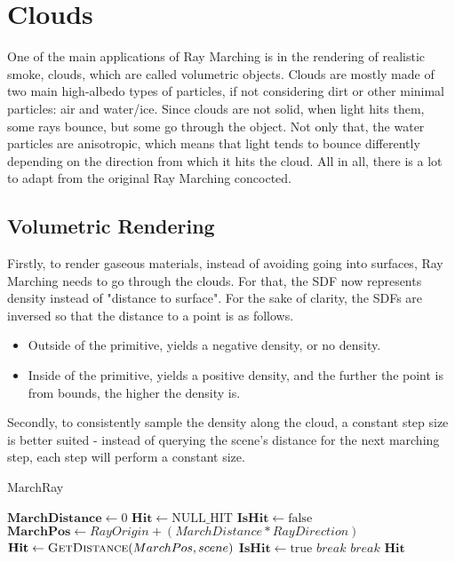 \chapter{Clouds}\label{chp:LABEL_CHP_4}

One of the main applications of Ray Marching is in the rendering of realistic smoke, clouds, which are called volumetric objects. Clouds are mostly made of two main high-albedo types of particles, if not considering dirt or other minimal particles: air and water/ice. \cite{:REF_IN_1}
Since clouds are not solid, when light hits them, some rays bounce, but some go through the object. Not only that, the water particles are anisotropic\cite{:REF_IN_1}, which means that light tends to bounce differently depending on the direction from which it hits the cloud. All in all, there is a lot to adapt from the original Ray Marching concocted. 

\section{Volumetric Rendering}

Firstly, to render gaseous materials, instead of avoiding going into surfaces, Ray Marching needs to go through the clouds. For that, the SDF now represents density instead of "distance to surface". For the sake of clarity, the SDFs are inversed so that the distance to a point is as follows. 

\begin{itemize}
    \item Outside of the primitive, yields a negative density, or no density.
    \item Inside of the primitive, yields a positive density, and the further the point is from bounds, the higher the density is.
\end{itemize}

Secondly, to consistently sample the density along the cloud, a constant step size is better suited - instead of querying the scene's distance for the next marching step, each step will perform a constant size.

\begin{algorithm}[H]
\caption{MarchRay}
\label{alg:marchray}
\begin{algorithmic}[1]
    \State $ \mathbf{MarchDistance} \gets \text{0} $
    \State $ \mathbf{Hit} \gets \text{NULL\_HIT} $
    \State $ \mathbf{IsHit} \gets \text{false} $
        \State $\mathbf{MarchPos} \gets  RayOrigin+ (MarchDistance * RayDirection) $
        \State $\mathbf{Hit} \gets \Call{GetDistance}{MarchPos, scene}$
            \State $ \mathbf{IsHit} \gets \text{true} $
            \State $ break $
        \EndIf
            \State $ break $
        \EndIf
    \EndFor
    \State \Return $\mathbf{Hit}$
\EndProcedure
\end{algorithmic}
\end{algorithm}


